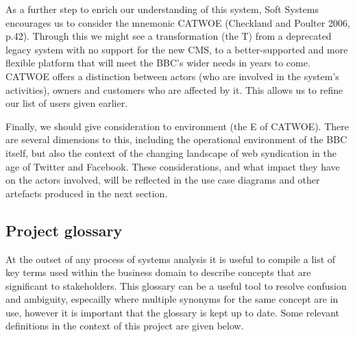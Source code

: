 \documentclass{article}
\begin{document}
As a further step to enrich our understanding of this system, Soft Systems encourages us to consider the mnemonic CATWOE (Checkland and Poulter 2006, p.42). Through this we might see a transformation (the T) from a deprecated legacy system with no support for the new CMS, to a better-supported and more flexible platform that will meet the BBC's wider needs in years to come. CATWOE offers a distinction between actors (who are involved in the system's activities), owners and customers who are affected by it. This allows us to refine our list of users given earlier.

Finally, we should give consideration to environment (the E of CATWOE). There are several dimensions to this, including the operational environment of the BBC itself, but also the context of the changing landscape of web syndication in the age of Twitter and Facebook. These considerations, and what impact they have on the actors involved, will be reflected in the use case diagrams and other artefacts produced in the next section.




\subsection{Project glossary}

At the outset of any process of systems analysis it is useful to compile a list of key terms used within the business domain to describe concepts that are significant to stakeholders. This glossary can be a useful tool to resolve confusion and ambiguity, especailly where multiple synonyms for the same concept are in use, however it is important that the glossary is kept up to date. Some relevant definitions in the context of this project are given below.
\end{document}

